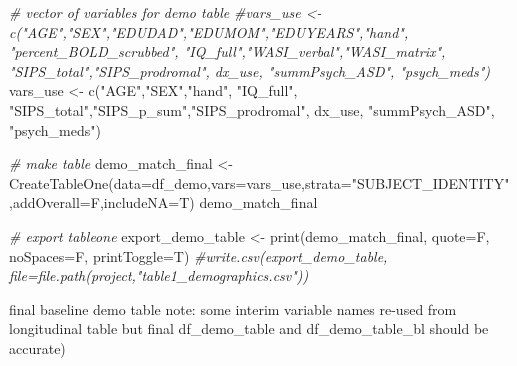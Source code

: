 \documentclass[
]{article}
\newenvironment{Shaded}{\begin{snugshade}}{\end{snugshade}}
\newcommand{\AttributeTok}[1]{\textcolor[rgb]{0.77,0.63,0.00}{#1}}
\newcommand{\CommentTok}[1]{\textcolor[rgb]{0.56,0.35,0.01}{\textit{#1}}}
\newcommand{\FunctionTok}[1]{\textcolor[rgb]{0.00,0.00,0.00}{#1}}
\newcommand{\NormalTok}[1]{#1}
\newcommand{\OtherTok}[1]{\textcolor[rgb]{0.56,0.35,0.01}{#1}}
\newcommand{\StringTok}[1]{\textcolor[rgb]{0.31,0.60,0.02}{#1}}
\begin{document}
\begin{Shaded}
\begin{Highlighting}[]
\CommentTok{\# vector of variables for demo table}
\CommentTok{\#vars\_use \textless{}{-} c("AGE","SEX","EDUDAD","EDUMOM","EDUYEARS","hand", "percent\_BOLD\_scrubbed", "IQ\_full","WASI\_verbal","WASI\_matrix", "SIPS\_total","SIPS\_prodromal", dx\_use, "summPsych\_ASD", "psych\_meds")}
\NormalTok{vars\_use }\OtherTok{\textless{}{-}} \FunctionTok{c}\NormalTok{(}\StringTok{"AGE"}\NormalTok{,}\StringTok{"SEX"}\NormalTok{,}\StringTok{"hand"}\NormalTok{, }\StringTok{"IQ\_full"}\NormalTok{, }\StringTok{"SIPS\_total"}\NormalTok{,}\StringTok{"SIPS\_p\_sum"}\NormalTok{,}\StringTok{"SIPS\_prodromal"}\NormalTok{, dx\_use, }\StringTok{"summPsych\_ASD"}\NormalTok{, }\StringTok{"psych\_meds"}\NormalTok{)}

\CommentTok{\# make table}
\NormalTok{demo\_match\_final }\OtherTok{\textless{}{-}} \FunctionTok{CreateTableOne}\NormalTok{(}\AttributeTok{data=}\NormalTok{df\_demo,}\AttributeTok{vars=}\NormalTok{vars\_use,}\AttributeTok{strata=}\StringTok{"SUBJECT\_IDENTITY"}\NormalTok{,}\AttributeTok{addOverall=}\NormalTok{F,}\AttributeTok{includeNA=}\NormalTok{T)}
\NormalTok{demo\_match\_final}

\CommentTok{\# export tableone}
\NormalTok{export\_demo\_table }\OtherTok{\textless{}{-}} \FunctionTok{print}\NormalTok{(demo\_match\_final, }\AttributeTok{quote=}\NormalTok{F, }\AttributeTok{noSpaces=}\NormalTok{F, }\AttributeTok{printToggle=}\NormalTok{T)}
\CommentTok{\#write.csv(export\_demo\_table, file=file.path(project,"table1\_demographics.csv"))}
\end{Highlighting}
\end{Shaded}

final baseline demo table note: some interim variable names re-used from
longitudinal table but final df\_demo\_table and df\_demo\_table\_bl
should be accurate)
\end{document}
